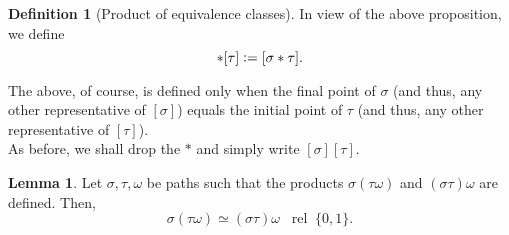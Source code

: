 \documentclass[12pt]{article}
\theoremstyle{definition}
\numberwithin{thm}{section}
\newtheorem{lem}[thm]{Lemma}
\newtheorem{defn}[thm]{Definition}
\newcommand{\rel}{\;\;\operatorname{rel}\;}
\begin{document}
\begin{defn}[Product of equivalence classes]
	In view of the above proposition, we define
	\begin{equation*} 
		[\sigma]*[\tau] \vcentcolon= [\sigma*\tau].
	\end{equation*}
\end{defn}
The above, of course, is defined only when the final point of $\sigma$ (and thus, any other representative of $[\sigma]$) equals the initial point of $\tau$ (and thus, any other representative of $[\tau]$).\\
As before, we shall drop the $*$ and simply write $[\sigma][\tau].$

\begin{lem} \label{lem:prodassoc}
	Let $\sigma, \tau, \omega$ be paths such that the products $\sigma(\tau\omega)$ and $(\sigma\tau)\omega$ are defined. Then,
	\begin{equation*} 
		\sigma(\tau\omega) \simeq (\sigma\tau)\omega \rel \{0, 1\}.
	\end{equation*}
\end{lem}
\end{document}
